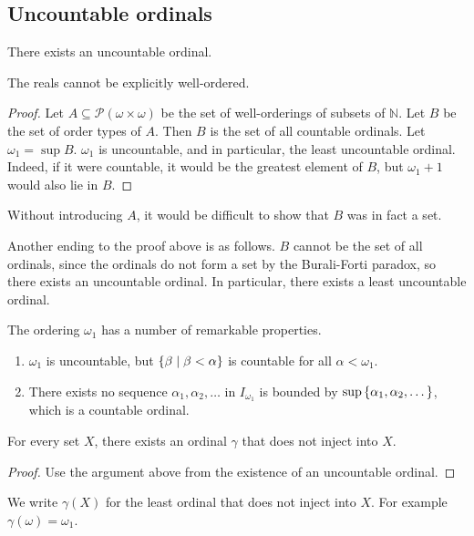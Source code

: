 \subsection{Uncountable ordinals}
\begin{theorem}
    There exists an uncountable ordinal.
\end{theorem}
\begin{remark}
    The reals cannot be explicitly well-ordered.
\end{remark}
\begin{proof}
    Let \( A \subseteq \mathcal P (\omega \times \omega) \) be the set of well-orderings of subsets of \( \mathbb N \).
    Let \( B \) be the set of order types of \( A \).
    Then \( B \) is the set of all countable ordinals.
    Let \( \omega_1 = \sup B \).
    \( \omega_1 \) is uncountable, and in particular, the least uncountable ordinal.
    Indeed, if it were countable, it would be the greatest element of \( B \), but \( \omega_1 + 1 \) would also lie in \( B \).
\end{proof}
\begin{remark}
    Without introducing \( A \), it would be difficult to show that \( B \) was in fact a set.
\end{remark}
\begin{remark}
    Another ending to the proof above is as follows.
    \( B \) cannot be the set of all ordinals, since the ordinals do not form a set by the Burali-Forti paradox, so there exists an uncountable ordinal.
    In particular, there exists a least uncountable ordinal.
\end{remark}
The ordering \( \omega_1 \) has a number of remarkable properties.
\begin{enumerate}
    \item \( \omega_1 \) is uncountable, but \( \qty{\beta \mid \beta < \alpha} \) is countable for all \( \alpha < \omega_1 \).
    \item There exists no sequence \( \alpha_1, \alpha_2, \dots \) in \( I_{\omega_1} \) is bounded by \( \sup\qty{\alpha_1, \alpha_2, \dots} \), which is a countable ordinal.
\end{enumerate}
\begin{theorem}
    For every set \( X \), there exists an ordinal \( \gamma \) that does not inject into \( X \).
\end{theorem}
\begin{proof}
    Use the argument above from the existence of an uncountable ordinal.
\end{proof}
We write \( \gamma(X) \) for the least ordinal that does not inject into \( X \).
For example \( \gamma(\omega) = \omega_1 \).


